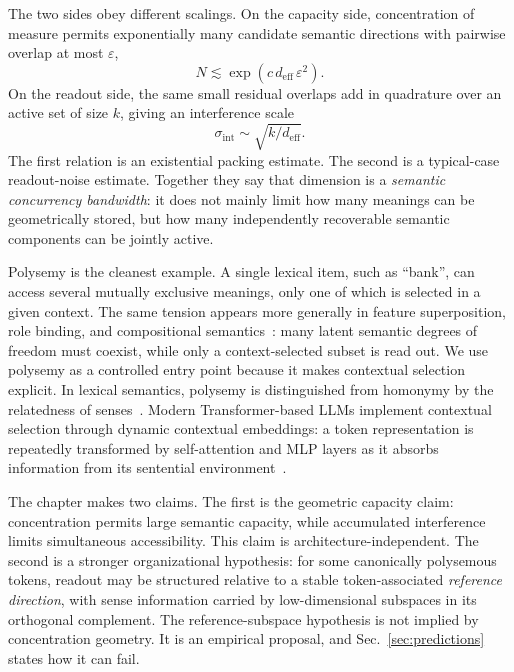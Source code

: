 \documentclass[
  aps,
  reprint,
  superscriptaddress,
  floatfix,
  nofootinbib,
  longbibliography
]{revtex4-2}
\newcommand{\deff}{d_{\mathrm{eff}}}
\newcommand{\sint}{\sigma_{\mathrm{int}}}
\begin{document}
The two sides obey different scalings. On the capacity side,
concentration of measure permits exponentially many candidate semantic
directions with pairwise overlap at most $\varepsilon$,
%
\begin{equation}
\label{eq:intro-capacity}
N\lesssim \exp(c\,\deff\,\varepsilon^{2}).
\end{equation}
%
On the readout side, the same small residual overlaps add in quadrature
over an active set of size $k$, giving an interference scale
%
\begin{equation}
\label{eq:intro-readout}
\sint\sim\sqrt{k/\deff}.
\end{equation}
%
The first relation is an existential packing estimate. The second is a
typical-case readout-noise estimate. Together they say that dimension
is a \emph{semantic concurrency bandwidth}: it does not mainly limit how
many meanings can be geometrically stored, but how many independently
recoverable semantic components can be jointly active.

Polysemy is the cleanest example. A single lexical item, such as
``bank'', can access several mutually exclusive meanings, only one of
which is selected in a given context. The same tension appears more
generally in feature superposition, role binding, and compositional
semantics~\cite{mikolov2013}: many latent semantic degrees of freedom
must coexist, while only a context-selected subset is read out. We use
polysemy as a controlled entry point because it makes contextual
selection explicit. In lexical semantics, polysemy is distinguished
from homonymy by the relatedness of senses~\cite{pustejovsky1995}.
Modern Transformer-based LLMs implement contextual selection through
dynamic contextual embeddings: a token representation is repeatedly
transformed by self-attention and MLP layers as it absorbs information
from its sentential environment~\cite{Vaswani-2017-Attention}.

The chapter makes two claims. The first is the geometric capacity claim:
concentration permits large semantic capacity, while accumulated
interference limits simultaneous accessibility. This claim is
architecture-independent. The second is a stronger organizational
hypothesis: for some canonically polysemous tokens, readout may be
structured relative to a stable token-associated \emph{reference direction},
with sense information carried by low-dimensional subspaces in its
orthogonal complement. The reference-subspace hypothesis is not implied by
concentration geometry. It is an empirical proposal, and
Sec.~\ref{sec:predictions} states how it can fail.
\end{document}
